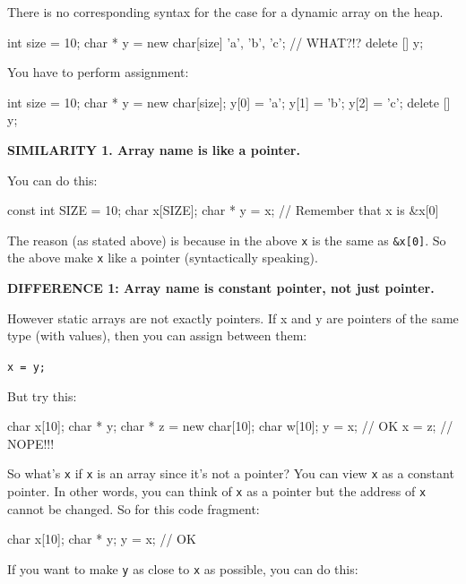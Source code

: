 There is no corresponding syntax for the case for a dynamic array on the heap.

\begin{consolethree}[escapeinside=||]
int size = 10;
char * y = new char[size] {'a', 'b', 'c'}; // WHAT?!?
delete [] y;
\end{consolethree}

You have to perform assignment:

\begin{consolethree}[escapeinside=||]
int size = 10;
char * y = new char[size];
y[0] = 'a';
y[1] = 'b';
y[2] = 'c';
delete [] y;
\end{consolethree}


\textbf{SIMILARITY 1. Array name is like a pointer.}

You can do this:

\begin{consolethree}[escapeinside=||]
const int SIZE = 10;
char x[SIZE];
char * y = x; // Remember that x is &x[0]
\end{consolethree}

The reason (as stated above) is because in the above \texttt{x} is the same as \texttt{\&x[0]}. So the above make \texttt{x} like a pointer (syntactically speaking).

\textbf{DIFFERENCE 1: Array name is constant pointer, not just pointer.}

However static arrays are not exactly pointers. If x and y are pointers of the same type (with values), then you can assign between them:

\verb!x = y;!

But try this:

\begin{consolethree}[escapeinside=||]
char x[10];
char * y;
char * z = new char[10];
char w[10];
y = x; // OK
x = z; // NOPE!!!
\end{consolethree}

So what's \texttt{x} if \texttt{x} is an array since it's not a pointer? You can view \texttt{x} as a constant pointer. In other words, you can think of \texttt{x} as a pointer but the address of \texttt{x} cannot be changed. So for this code fragment:

\begin{consolethree}[escapeinside=||]
char x[10];
char * y;
y = x; // OK
\end{consolethree}

If you want to make \texttt{y} as close to \texttt{x} as possible, you can do this:

